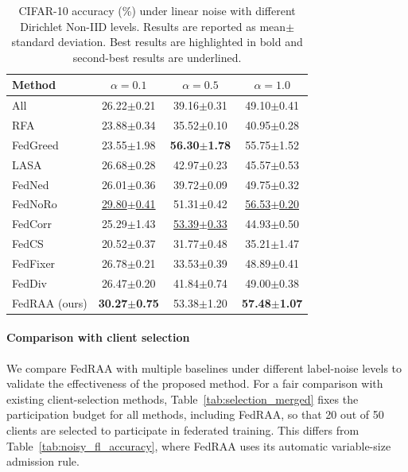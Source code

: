 \documentclass[conference]{IEEEtran}
\theoremstyle{definition}
\theoremstyle{remark}
\begin{document}
\begin{table}[H]
\centering
\caption{CIFAR-10 accuracy (\%) under linear noise with different Dirichlet Non-IID levels. Results are reported as mean$\pm$standard deviation. Best results are highlighted in bold and second-best results are underlined.}
\label{tab:noniid_robustness}
\setlength{\tabcolsep}{5pt}
\renewcommand{\arraystretch}{1.10}
\begin{tabular}{lccc}
\toprule
\textbf{Method} & $\alpha=0.1$ & $\alpha=0.5$ & $\alpha=1.0$ \\
\midrule
All & 26.22$\pm$0.21 & 39.16$\pm$0.31 & 49.10$\pm$0.41 \\
RFA~\cite{pillutla2022robust} & 23.88$\pm$0.34 & 35.52$\pm$0.10 & 40.95$\pm$0.28 \\
FedGreed~\cite{kritharakis2025fedgreed} & 23.55$\pm$1.98 & \textbf{56.30$\pm$1.78} & 55.75$\pm$1.52 \\
LASA~\cite{xu2025lasa} & 26.68$\pm$0.28 & 42.97$\pm$0.23 & 45.57$\pm$0.53 \\
FedNed~\cite{lu2024fedned} & 26.01$\pm$0.36 & 39.72$\pm$0.09 & 49.75$\pm$0.32 \\
FedNoRo~\cite{wu2023fednoro} & \underline{29.80$\pm$0.41} & 51.31$\pm$0.42 & \underline{56.53$\pm$0.20} \\
FedCorr~\cite{xu2022fedcorr} & 25.29$\pm$1.43 & \underline{53.39$\pm$0.33} & 44.93$\pm$0.50 \\
FedCS~\cite{hao2025fedcs} & 20.52$\pm$0.37 & 31.77$\pm$0.48 & 35.21$\pm$1.47 \\
FedFixer~\cite{ji2024fedfixer} & 26.78$\pm$0.21 & 33.53$\pm$0.39 & 48.89$\pm$0.41 \\
FedDiv~\cite{li2024feddiv} & 26.47$\pm$0.20 & 41.84$\pm$0.74 & 49.00$\pm$0.38 \\
\midrule
FedRAA (ours) & \textbf{30.27$\pm$0.75} & 53.38$\pm$1.20 & \textbf{57.48$\pm$1.07} \\
\bottomrule
\end{tabular}
\end{table}


\paragraph{Comparison with client selection}
\label{para:comp_cs}
We compare FedRAA with multiple baselines under different label-noise levels to validate the effectiveness of the proposed method. For a fair comparison with existing client-selection methods, Table~\ref{tab:selection_merged} fixes the participation budget for all methods, including FedRAA, so that 20 out of 50 clients are selected to participate in federated training. This differs from Table~\ref{tab:noisy_fl_accuracy}, where FedRAA uses its automatic variable-size admission rule.
\end{document}
